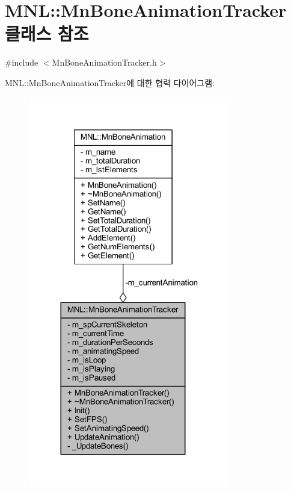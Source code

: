 \hypertarget{class_m_n_l_1_1_mn_bone_animation_tracker}{}\section{M\+NL\+:\+:Mn\+Bone\+Animation\+Tracker 클래스 참조}
\label{class_m_n_l_1_1_mn_bone_animation_tracker}


{\ttfamily \#include $<$Mn\+Bone\+Animation\+Tracker.\+h$>$}



M\+NL\+:\+:Mn\+Bone\+Animation\+Tracker에 대한 협력 다이어그램\+:\nopagebreak
\begin{figure}[H]
\begin{center}
\leavevmode
\includegraphics[width=252pt]{class_m_n_l_1_1_mn_bone_animation_tracker__coll__graph}
\end{center}
\end{figure}
